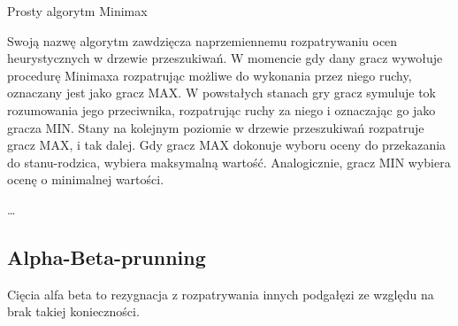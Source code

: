 {\small
\begin{pseudokod}[H]
\caption{Prosty algorytm Minimax}\label{alg:mine}
\end{pseudokod}
}

Swoją nazwę algorytm zawdzięcza naprzemiennemu rozpatrywaniu ocen heurystycznych w drzewie przeszukiwań. W momencie gdy dany gracz wywołuje procedurę Minimaxa rozpatrując możliwe do wykonania przez niego ruchy, oznaczany jest jako gracz MAX. W powstałych stanach gry gracz symuluje tok rozumowania jego przeciwnika, rozpatrując ruchy za niego i oznaczając go jako gracza MIN. Stany na kolejnym poziomie w drzewie przeszukiwań rozpatruje gracz MAX, i tak dalej. Gdy gracz MAX dokonuje wyboru oceny do przekazania do stanu-rodzica, wybiera maksymalną wartość. Analogicznie, gracz MIN wybiera ocenę o minimalnej wartości.

\ldots

\subsection{Alpha-Beta-prunning}

Cięcia alfa beta to rezygnacja z rozpatrywania innych podgałęzi ze względu na brak takiej konieczności.

